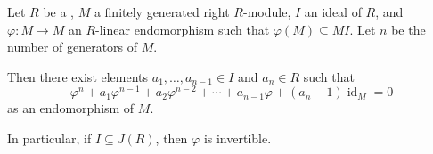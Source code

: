 \begin{lemma}  \label{lemma:determinant_lemma_for_modules_over_a_ring}
	Let $R$ be a , $M$ a finitely generated right $R$-module, $I$ an ideal of $R$, and $\varphi \colon M \to M$ an $R$-linear endomorphism such that $\varphi(M) \subseteq MI$. Let $n$ be the number of generators of $M$.

	Then there exist elements $a_1, \ldots, a_{n-1} \in I$ and $a_n \in R$ such that
	$$\varphi^n + a_1 \varphi^{n-1} + a_2 \varphi^{n-2} + \cdots + a_{n-1} \varphi + (a_n - 1) \operatorname{id}_M = 0$$
	as an endomorphism of $M$.

	In particular, if $I \subseteq J(R)$, then $\varphi$ is invertible.
\end{lemma}
